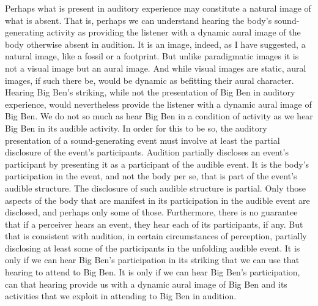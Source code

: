 \documentclass[12pt]{article}
\begin{document}
Perhaps what is present in auditory experience may constitute a natural image of what is absent. That is, perhaps we can understand hearing the body’s sound-generating activity as providing the listener with a dynamic aural image of the body otherwise absent in audition. It is an image, indeed, as I have suggested, a natural image, like a fossil or a footprint. But unlike paradigmatic images it is not a visual image but an aural image. And while visual images are static, aural images, if such there be, would be dynamic as befitting their aural character. Hearing Big Ben’s striking, while not the presentation of Big Ben in auditory experience, would nevertheless provide the listener with a dynamic aural image of Big Ben. We do not so much as hear Big Ben in a condition of activity as we hear Big Ben in its audible activity. In order for this to be so, the auditory presentation of a sound-generating event must involve at least the partial disclosure of the event’s participants. Audition partially discloses an event’s participant by presenting it as a participant of the audible event. It is the body’s participation in the event, and not the body per se, that is part of the event’s audible structure. The disclosure of such audible structure is partial. Only those aspects of the body that are manifest in its participation in the audible event are disclosed, and perhaps only some of those. Furthermore, there is no guarantee that if a perceiver hears an event, they hear each of its participants, if any. But that is consistent with audition, in certain circumstances of perception, partially disclosing at least some of the participants in the unfolding audible event. It is only if we can hear Big Ben’s participation in its striking that we can use that hearing to attend to Big Ben. It is only if we can hear Big Ben’s participation, can that hearing provide us with a dynamic aural image of Big Ben and its activities that we exploit in attending to Big Ben in audition.
\end{document}
